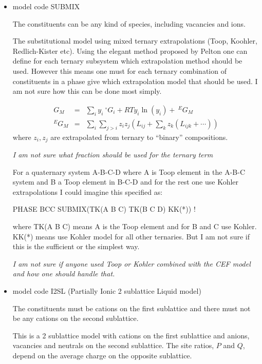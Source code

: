 \documentclass[12pt]{article}
\begin{document}
\begin{itemize}
  {\em I am not sure how to specify the independent binary variable
    and what fractions should be used for any ternary term}

\item model code SUBMIX

  The constituents can be any kind of species, including vacancies and
  ions.

  The substitutional model using mixed ternary extrapolations (Toop,
  Koohler, Redlich-Kister etc).  Using the elegant method proposed by
  Pelton\cite{01Pel} one can define for each ternary subsystem which
  extrapolation method should be used.  However this means one must
  for each ternary combination of constituents in a phase give which
  extrapolation model that should be used.  I am not sure how this can
  be done most simply.

  \begin{eqnarray}
    G_M &=& \sum_i y_i~^{\circ}G_i + RT y_i\ln(y_i) + ~^EG_M\\ ^EG_M &=&
    \sum_i \sum_{j>i} z_i z_j (L_{ij} + \sum_k z_k (L_{ijk} + \cdots))
  \end{eqnarray}
  where $z_i, z_j$ are extrapolated from ternary to ``binary''
  compositions.  
  
  {\em I am not sure what fraction should be used for the ternary term
  
  For a quaternary system A-B-C-D where A is Toop element in the A-B-C
  system and B a Toop element in B-C-D and for the rest one use Kohler
  extrapolations I could imagine this specified as:
  
  PHASE BCC SUBMIX(TK(A B C) TK(B C D) KK(*)) !
  
  where TK(A B C) means A is the Toop element and for B and C use
  Kohler.  KK(*) means use Kohler model for all other ternaries.  But
  I am not sure if this is the sufficient or the simplest way.}

  {\em I am not sure if anyone used Toop or Kohler combined with the
    CEF model and how one should handle that.}
  
\item model code I2SL (Partially Ionic 2 sublattice Liquid model)

  The constituents must be cations on the first sublattice and there
  must not be any cations on the second sublattice.

  This is a 2 sublattice model with cations on the first sublattice
  and anions, vacancies and neutrals on the second sublattice.  The
  site ratios, $P$ and $Q$, depend on the average charge on the
  opposite sublattice.


\end{itemize}
\end{document}
